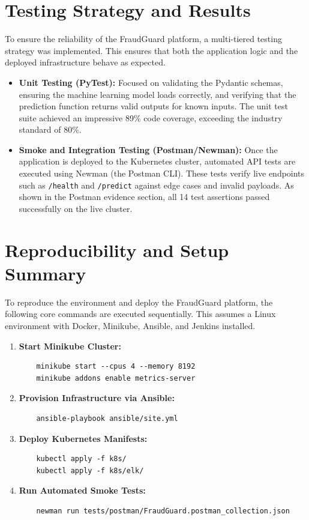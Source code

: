 \documentclass[12pt,a4paper]{article}
\begin{document}
\section{Testing Strategy and Results}
To ensure the reliability of the FraudGuard platform, a multi-tiered testing strategy was implemented. This ensures that both the application logic and the deployed infrastructure behave as expected.

\begin{itemize}
    \item \textbf{Unit Testing (PyTest):} Focused on validating the Pydantic schemas, ensuring the machine learning model loads correctly, and verifying that the prediction function returns valid outputs for known inputs. The unit test suite achieved an impressive 89\% code coverage, exceeding the industry standard of 80\%.
    \item \textbf{Smoke and Integration Testing (Postman/Newman):} Once the application is deployed to the Kubernetes cluster, automated API tests are executed using Newman (the Postman CLI). These tests verify live endpoints such as \texttt{/health} and \texttt{/predict} against edge cases and invalid payloads. As shown in the Postman evidence section, all 14 test assertions passed successfully on the live cluster.
\end{itemize}

\section{Reproducibility and Setup Summary}
To reproduce the environment and deploy the FraudGuard platform, the following core commands are executed sequentially. This assumes a Linux environment with Docker, Minikube, Ansible, and Jenkins installed.

\begin{enumerate}
    \item \textbf{Start Minikube Cluster:}
    \begin{verbatim}
    minikube start --cpus 4 --memory 8192
    minikube addons enable metrics-server
    \end{verbatim}
    
    \item \textbf{Provision Infrastructure via Ansible:}
    \begin{verbatim}
    ansible-playbook ansible/site.yml
    \end{verbatim}
    
    \item \textbf{Deploy Kubernetes Manifests:}
    \begin{verbatim}
    kubectl apply -f k8s/
    kubectl apply -f k8s/elk/
    \end{verbatim}
    
    \item \textbf{Run Automated Smoke Tests:}
    \begin{verbatim}
    newman run tests/postman/FraudGuard.postman_collection.json
    \end{verbatim}
\end{enumerate}
\end{document}
